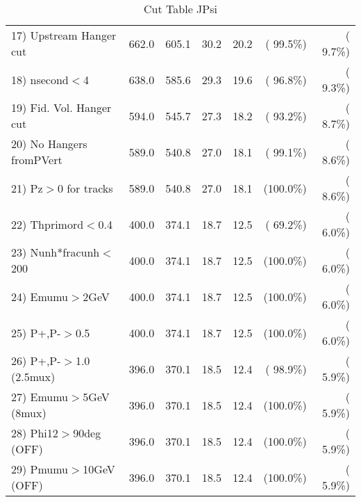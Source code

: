 \begin{table}[h!]
\begin{tabular}{||l||r|r|r|r|r|r||}
 17) Upstream Hanger cut  &        662.0 &        605.1 &         30.2 &         20.2 & ( 99.5\%) & (  9.7\%) \\
 18) nsecond$<$4          &        638.0 &        585.6 &         29.3 &         19.6 & ( 96.8\%) & (  9.3\%) \\
 19) Fid. Vol. Hanger cut &        594.0 &        545.7 &         27.3 &         18.2 & ( 93.2\%) & (  8.7\%) \\
 20) No Hangers fromPVert &        589.0 &        540.8 &         27.0 &         18.1 & ( 99.1\%) & (  8.6\%) \\
 21) Pz$>$0 for tracks    &        589.0 &        540.8 &         27.0 &         18.1 & (100.0\%) & (  8.6\%) \\
 22) Thprimord$<$0.4      &        400.0 &        374.1 &         18.7 &         12.5 & ( 69.2\%) & (  6.0\%) \\
 23) Nunh*fracunh$<$200   &        400.0 &        374.1 &         18.7 &         12.5 & (100.0\%) & (  6.0\%) \\
 24) Emumu$>$2GeV         &        400.0 &        374.1 &         18.7 &         12.5 & (100.0\%) & (  6.0\%) \\
 25) P+,P-$>$0.5          &        400.0 &        374.1 &         18.7 &         12.5 & (100.0\%) & (  6.0\%) \\
 26) P+,P-$>$1.0 (2.5mux) &        396.0 &        370.1 &         18.5 &         12.4 & ( 98.9\%) & (  5.9\%) \\
 27) Emumu$>$5GeV  (8mux) &        396.0 &        370.1 &         18.5 &         12.4 & (100.0\%) & (  5.9\%) \\
 28) Phi12$>$90deg  (OFF) &        396.0 &        370.1 &         18.5 &         12.4 & (100.0\%) & (  5.9\%) \\
 29) Pmumu$>$10GeV  (OFF) &        396.0 &        370.1 &         18.5 &         12.4 & (100.0\%) & (  5.9\%) \\
 \hline
 \hline
 \end{tabular}
 \caption{Cut Table  JPsi     }
 \label{tab-cutcohjpsi-mumu_cohrhop}
 \end{table}
